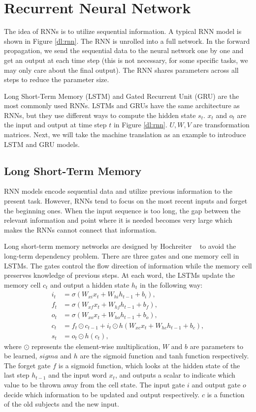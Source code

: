 \section{Recurrent Neural Network}
The idea of RNNs is to utilize sequential information. A typical RNN model is shown in Figure \ref{dl:rnn}. The RNN is unrolled into a full network. In the forward propagation, we send the sequential data to the neural network one by one and get an output at each time step (this is not necessary, for some specific tasks, we may only care about the final output). The RNN shares parameters across all steps to reduce the parameter size.

Long Short-Term Memory (LSTM) and Gated Recurrent Unit (GRU) are the most commonly used RNNs. LSTMs and GRUs have the same architecture as RNNs, but they use different ways to compute the hidden state $s_t$. $x_t$ and $o_t$ are the input and output at time step $t$ in Figure \ref{dl:rnn}. $U, W, V$ are transformation matrices. Next, we will take the machine translation as an example to introduce LSTM and GRU models.

\subsection{Long Short-Term Memory}
RNN models encode sequential data and utilize previous information to the present task. However, RNNs tend to focus on the most recent inputs and forget the beginning ones. When the input sequence is too long, the gap between the relevant information and point where it is needed becomes very large which makes the RNNs cannot connect that information.

Long short-term memory networks are designed by Hochreiter \etal~\cite{hochreiter1997long} to avoid the long-term dependency problem. There are three gates and one memory cell in LSTMs. The gates control the flow direction of information while the memory cell preserves knowledge of previous steps. At each word, the LSTMs update the memory cell $c_t$ and output a hidden state $h_t$ in the following way:
\begin{align}
i_t &= \sigma{(W_{xi} x_t + W_{hi} h_{t-1} + b_i)}, \nonumber \\
f_t &= \sigma{(W_{xf} x_t + W_{hf} h_{t-1} + b_f)}, \nonumber \\
o_t &= \sigma{(W_{xo} x_t + W_{ho} h_{t-1} + b_o)}, \\
c_t &= f_t \odot c_{t-1} + i_t \odot h{(W_{xc} x_t + W_{hc} h_{t-1} + b_c)}, \nonumber\\
s_t &= o_t \odot h{(c_t)}, \nonumber
\end{align}
where $\odot$ represents the element-wise multiplication, $W$ and $b$ are parameters to be learned, $sigma$ and $h$ are the sigmoid function and tanh function respectively.
The forget gate $f$ is a sigmoid function, which looks at the hidden state of the last step $h_{t-1}$ and the input word $x_t$, and outputs a scalar to indicate which value to be thrown away from the cell state. The input gate $i$ and output gate $o$ decide which information to be updated and output respectively. $c$ is a function of the old subjects and the new input.

